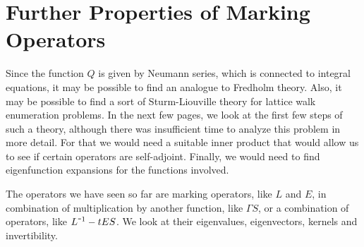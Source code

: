 \section{Further Properties of Marking Operators}

Since the function $Q$ is given by Neumann series, which is connected to integral equations, it may be possible to find an analogue to Fredholm theory. Also, it may be possible to find a sort of Sturm-Liouville theory for lattice walk enumeration problems. In the next few pages, we look at the first few steps of such a theory, although there was insufficient time to analyze this problem in more detail. For that we would need a suitable inner product that would allow us to see if certain operators are self-adjoint. Finally, we would need to find eigenfunction expansions for the functions involved.

The operators we have seen so far are marking operators, like $L$ and $E$, in combination of multiplication by another function, like $\Gamma S$, or a combination of operators, like $L^{\um 1} - t ES$. We look at their eigenvalues, eigenvectors, kernels and invertibility.

